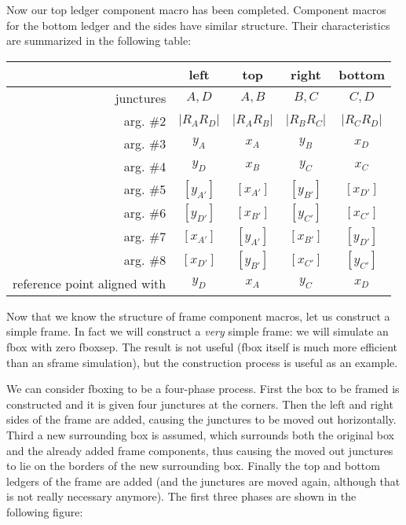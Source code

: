 \documentclass[11pt]{article}
\makeatletter
\def\macroname#1{{\ttfamily\@ttbs#1}}  %
\def\<#1>{\macroname{#1}}
\makeatother
\begin{document}
Now our top ledger component macro has been completed.
Component macros for the bottom ledger and the sides have similar
structure. Their characteristics are summarized in the following table:

\begin{tabular}{|r|c|c|c|c|}\hline\label{sframetable}%
           & left       & top        & right      & bottom     \\\hline\hline
junctures  & $A,D$      & $A,B$      & $B,C$      & $C,D$      \\\hline
arg. \#2   & $|R_AR_D|$ & $|R_AR_B|$ & $|R_BR_C|$ & $|R_CR_D|$ \\\hline
arg. \#3   & $y_A$      & $x_A$      & $y_B$      & $x_D$      \\\hline
arg. \#4   & $y_D$      & $x_B$      & $y_C$      & $x_C$      \\\hline
arg. \#5   & $[y_{A'}]$ & $[x_{A'}]$ & $[y_{B'}]$ & $[x_{D'}]$ \\\hline
arg. \#6   & $[y_{D'}]$ & $[x_{B'}]$ & $[y_{C'}]$ & $[x_{C'}]$ \\\hline
arg. \#7   & $[x_{A'}]$ & $[y_{A'}]$ & $[x_{B'}]$ & $[y_{D'}]$ \\\hline
arg. \#8   & $[x_{D'}]$ & $[y_{B'}]$ & $[x_{C'}]$ & $[y_{C'}]$ \\\hline
\parbox{80pt}{\raggedleft\strut reference point aligned with\strut} &
             $y_D$      & $x_A$      & $y_C$      & $x_D$      \\\hline
\end{tabular}

Now that we know the structure of frame component macros, let us construct
a simple frame. In fact we will construct a \emph{very} simple frame:
we will simulate an \<fbox> with zero \<fboxsep>. The result is not useful
(\<fbox> itself is much more efficient than an \<sframe> simulation), but
the construction process is useful as an example.

We can consider fboxing to be a four-phase process. First the box to
be framed is constructed and it is given four junctures at the corners.
Then the left and right sides of the frame are added, causing the junctures
to be moved out horizontally. Third a new surrounding box is assumed,
which surrounds both the original box and the already added frame components,
thus causing the moved out junctures to lie on the borders of the new
surrounding box. Finally the top and bottom ledgers of the frame are added
(and the junctures are moved again, although that is not really necessary
anymore). The first three phases are shown in the following figure:
\end{document}
